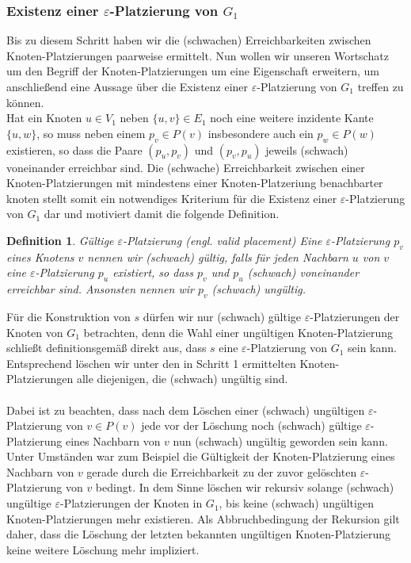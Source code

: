 \documentclass[a4paper, 12pt, twoside]{article}
\theoremstyle{Format1} %
\newtheorem{Def}{Definition}[section]       %
\begin{document}
\subsubsection{Existenz einer $\varepsilon$-Platzierung von $G_1$}
Bis zu diesem Schritt haben wir die (schwachen) Erreichbarkeiten zwischen Knoten-Platzierungen paarweise ermittelt.
Nun wollen wir unseren Wortschatz um den Begriff der Knoten-Platzierungen um eine Eigenschaft erweitern, um anschließend eine Aussage über die Existenz
einer $\varepsilon$-Platzierung von $G_1$ treffen zu können.
\\
Hat ein Knoten $u \in V_1$ neben $\{u,v\} \in E_1$ noch eine weitere inzidente Kante $\{u,w\}$, so muss neben einem $p_v \in P(v)$ insbesondere auch
ein $p_w \in P(w)$ existieren, so dass die Paare $(p_u,p_v)$ und $(p_v,p_u)$ jeweils (schwach) voneinander erreichbar sind. Die (schwache) Erreichbarkeit
zwischen einer Knoten-Platzierungen mit mindestens einer Knoten-Platzeriung benachbarter knoten stellt somit ein notwendiges Kriterium für die Existenz
einer $\varepsilon$-Platzierung von $G_1$ dar und motiviert damit die folgende Definition.

\begin{Def}
	Gültige $\varepsilon$-Platzierung (engl. valid placement)
	Eine $\varepsilon$-Platzierung $p_v$ eines Knotens $v$ nennen wir (schwach) \textit{gültig}, falls für jeden Nachbarn $u$ von $v$
	eine $\varepsilon$-Platzierung $p_u$ existiert, so dass $p_v$ und $p_u$ (schwach) voneinander erreichbar sind.
	Ansonsten nennen wir $p_v$ (schwach) ungültig.
\end{Def}

Für die Konstruktion von $s$ dürfen wir nur (schwach) gültige $\varepsilon$-Platzierungen der Knoten von $G_1$ betrachten, denn die
Wahl einer ungültigen Knoten-Platzierung schließt definitionsgemäß direkt aus, dass $s$ eine $\varepsilon$-Platzierung von $G_1$ sein kann.
Entsprechend löschen wir unter den in Schritt 1 ermittelten Knoten-Platzierungen alle diejenigen, die (schwach) ungültig sind.
\\
\\
Dabei ist zu beachten, dass nach dem Löschen einer (schwach) ungültigen $\varepsilon$-Platzierung von $v \in P(v)$
jede vor der Löschung noch (schwach) gültige $\varepsilon$-Platzierung eines Nachbarn von $v$ nun (schwach) ungültig geworden sein kann.
Unter Umständen war zum Beispiel die Gültigkeit der Knoten-Platzierung eines Nachbarn von $v$ gerade durch die Erreichbarkeit zu der zuvor gelöschten
$\varepsilon$-Platzierung von $v$ bedingt.
In dem Sinne löschen wir rekursiv solange (schwach) ungültige $\varepsilon$-Platzierungen der Knoten in $G_1$, bis
keine (schwach) ungültigen Knoten-Platzierungen mehr existieren. Als Abbruchbedingung der Rekursion gilt daher, dass die Löschung der letzten bekannten
ungültigen Knoten-Platzierung keine weitere Löschung mehr impliziert.
\end{document}
